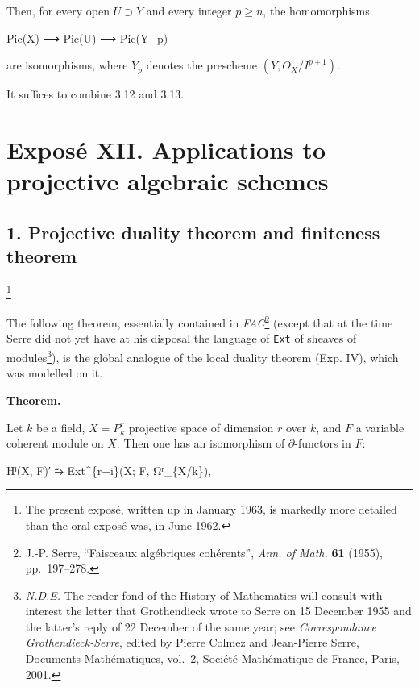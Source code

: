 \documentclass[
  11pt,
  a4paper,
]{book}
\newenvironment{Shaded}{}{}
\newcommand{\NormalTok}[1]{#1}
\begin{document}
Then, for every open \(U \supset Y\) and every integer
\(p \geqslant n\), the homomorphisms

\begin{Shaded}
\begin{Highlighting}[]
\NormalTok{Pic(X) ⟶ Pic(U) ⟶ Pic(Y\_p)}
\end{Highlighting}
\end{Shaded}

are isomorphisms, where \(Y_{p}\) denotes the prescheme
\((Y, O_{X}/I^{p+1})\).

It suffices to combine 3.12 and 3.13.

\chapter{Exposé XII. Applications to projective algebraic
schemes}\label{exposuxe9-xii.-applications-to-projective-algebraic-schemes}

\section{1. Projective duality theorem and finiteness
theorem}\label{projective-duality-theorem-and-finiteness-theorem}

\footnote{The present exposé, written up in January 1963, is markedly
  more detailed than the oral exposé was, in June 1962.}

The following theorem, essentially contained in \emph{FAC}\footnote{J.-P.
  Serre, ``Faisceaux algébriques cohérents'', \emph{Ann. of Math.}
  \textbf{61} (1955), pp.~197--278.} (except that at the time Serre did
not yet have at his disposal the language of \texttt{Ext} of sheaves of
modules\footnote{\emph{N.D.E.} The reader fond of the History of
  Mathematics will consult with interest the letter that Grothendieck
  wrote to Serre on 15 December 1955 and the latter's reply of 22
  December of the same year; see \emph{Correspondance
  Grothendieck-Serre}, edited by Pierre Colmez and Jean-Pierre Serre,
  Documents Mathématiques, vol.~2, Société Mathématique de France,
  Paris, 2001.}), is the global analogue of the local duality theorem
(Exp. IV), which was modelled on it.

\textbf{Theorem.}

Let \(k\) be a field, \(X = P^{r}_{k}\) projective space of dimension
\(r\) over \(k\), and \(F\) a variable coherent module on \(X\). Then
one has an isomorphism of \(\partial\)-functors in \(F\):

\begin{Shaded}
\begin{Highlighting}[]
\NormalTok{Hⁱ(X, F)′ ⥲ Ext\^{}\{r−i\}(X; F, Ωʳ\_\{X/k\}),}
\end{Highlighting}
\end{Shaded}
\end{document}
